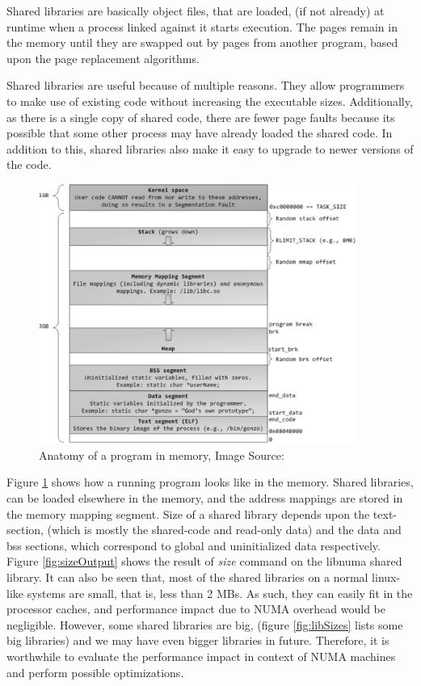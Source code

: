 
Shared libraries are basically object files, that are loaded, (if not already) at runtime
when a process linked against it starts execution. The pages remain in the memory until
they are swapped out by pages from another program, based upon the page replacement algorithms\cite{pageReplacement}.

Shared libraries are useful because of multiple reasons. They allow programmers to make use of existing
code without increasing the executable sizes. Additionally, as there is a single copy of shared code, there
are fewer page faults because its possible that some other process may have already loaded the shared code.
In addition to this, shared libraries also make it easy to upgrade to newer versions of the code.

\begin{figure}
    \centering
    \includegraphics[width=\linewidth, height=8.5cm]{linuxFlexibleAddressSpaceLayout.png}
    \caption{Anatomy of a program in memory, Image Source:\cite{anatomyOfProgramInMemory}}
    \label{fig:processInMemory}
\end{figure}

Figure \ref{fig:processInMemory} shows how a running program looks like in the memory. Shared libraries, can be
loaded elsewhere in the memory, and the address mappings are stored in the memory mapping segment.
Size of a shared library depends upon the text-section, (which is mostly the shared-code and read-only data) and
the data and bss sections, which correspond to global and uninitialized data respectively. Figure \ref{fig:sizeOutput}
shows the result of \textit{size} command on the libnuma shared library. It can also be seen that, most of the shared
libraries on a normal linux-like systems are small, that is, less than 2 MBs. As such, they can easily fit in the
processor caches, and performance impact due to NUMA overhead would be negligible. However, some shared libraries
are big, (figure \ref{fig:libSizes} lists some big libraries) and we may have even bigger libraries in future.
Therefore, it is worthwhile to evaluate the performance impact in context of NUMA machines and perform possible
optimizations.

